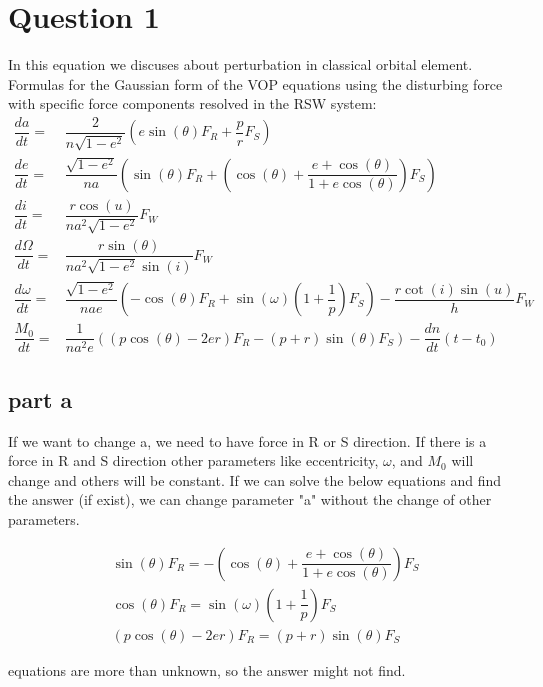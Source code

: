 \section{Question 1}
In this equation we discuses about perturbation in classical orbital element. 
Formulas for the Gaussian form of the VOP equations using the disturbing force with specific force components resolved in the RSW system:
\begin{equation}
\begin{aligned}
\dfrac{da}{dt} = & \dfrac{2}{n\sqrt{1-e^2}} \left( e\sin(\theta) F_R + \dfrac{p}{r}F_S\right) \\
\dfrac{de}{dt} =& \dfrac{\sqrt{1-e^2}}{na}\left(\sin(\theta)F_R+ \left(\cos(\theta) + \dfrac{e+\cos(\theta)}{1+e\cos(\theta)}\right)F_S\right) \\
\dfrac{di}{dt} = &\dfrac{r\cos(u)}{na^2\sqrt{1-e^2}}F_W \\
\dfrac{d\Omega}{dt} = &\dfrac{r\sin(\theta)}{na^2\sqrt{1-e^2}\sin(i)}F_W \\
\dfrac{d\omega}{dt} =& \dfrac{\sqrt{1-e^2}}{nae}\left(-\cos(\theta)F_R + \sin(\omega)\left(1+\dfrac{1}{p}\right)F_S \right) - \dfrac{r\cot(i)\sin(u)}{h}F_W\\
\dfrac{M_0}{dt} =& \dfrac{1}{na^2e} \left((p\cos(\theta) -2er)F_R - (p+r)\sin(\theta)F_S\right)-\dfrac{dn}{dt}(t - t_0)
\end{aligned}
\end{equation}
\subsection{part a}

If we want to change a, we need to have force in R or S direction. If there is a force in R and S direction other parameters like eccentricity, $\omega$, and $M_0$ will change and others will be constant. If we can solve the below equations and find the answer (if exist), we can change parameter "a" without the change of other parameters.

\begin{equation}
    \begin{aligned}
        &\sin(\theta)F_R = - \left(\cos(\theta) + \dfrac{e+\cos(\theta)}{1+e\cos(\theta)}\right)F_S\\
        &\cos(\theta)F_R = \sin(\omega)\left(1+\dfrac{1}{p}\right)F_S\\
        &(p\cos(\theta) -2er)F_R = (p+r)\sin(\theta)F_S
    \end{aligned}
\end{equation}

equations are more than unknown, so the answer might not find.
